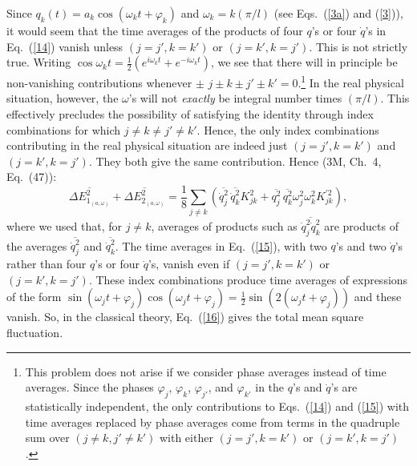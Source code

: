 \documentclass[12pt]{elsart}
\begin{document}
Since $q_k(t) = a_k \cos{(\omega_k t + \varphi_k)}$ and $\omega_k = k (\pi/l)$ (see Eqs.\ (\ref{3a}) and (\ref{3})), it would seem that the time averages of the products of four $q$'s or four $\dot{q}$'s in Eq.\ (\ref{14}) vanish unless $(j=j', k=k')$ or $(j=k', k=j')$. This is not strictly true. Writing $\cos{\omega_k}t = \frac{1}{2} \left( e^{i \omega_k t} + e^{- i \omega_k t} \right)$, we see that there will in principle be non-vanishing contributions whenever $\pm \,\, j \pm k \pm j' \pm k' = 0$.\footnote{This problem does not arise if we consider phase averages instead of time averages. Since the phases $\varphi_j$, $\varphi_k$, $\varphi_{j'}$, and $\varphi_{k'}$ in the $q$'s and $\dot{q}$'s are statistically independent, the only contributions to Eqs.\ (\ref{14}) and (\ref{15}) with time averages replaced by phase averages
come from terms in the quadruple sum over $(j \neq k, j' \neq k')$ with either $(j=j', k=k')$ or $(j=k', k=j')$.}  In the real physical situation, however, the $\omega$'s will not {\it exactly} be integral number times $(\pi/l)$. This effectively precludes the possibility of satisfying the identity through index combinations for which $j \neq k \neq j' \neq k'$. Hence, the only index combinations contributing in the real physical situation are indeed just $(j=j', k=k')$ and $(j=k', k=j')$. They both give the same contribution. Hence (3M, Ch.\ 4, Eq.\ (47)):
\begin{equation}
\overline{\Delta E_{1_{(a, \omega)}}^2} + \overline{\Delta E_{2_{(a, \omega)}}^2} =
\frac{1}{8}  \sum_{j \neq k} \left(  \overline{\dot{q}_j^2} \, \overline{\dot{q}_k^2} K_{jk}^2
+ \overline{q_j^2} \, \overline{q_k^2} \omega_j^2 \omega_k^2 K_{jk}^{\prime 2} \right),
\label{16}
\end{equation}
where we used that, for $j \neq k$, averages of products such as $\overline{ \dot{q}_j^2 \dot{q}_k^2 }$ are products of the averages
$\overline{\dot{q}_j^2}$ and $\overline{\dot{q}_k^2}$. The time averages in Eq.\ (\ref{15}), with two $q$'s and two $\dot{q}$'s rather than four $q$'s or four $\dot{q}$'s, vanish even if $(j=j', k=k')$ or $(j=k', k=j')$. These index combinations produce time averages of expressions of the form $\sin{(\omega_jt + \varphi_j)} \cos{(\omega_jt + \varphi_j)} = \frac{1}{2} \sin{(2(\omega_jt + \varphi_j))}$ and these vanish. So, in the classical theory, Eq.\ (\ref{16}) gives the total mean square fluctuation.
\end{document}
